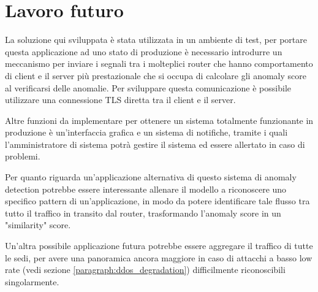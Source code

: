 \chapter{Lavoro futuro}

La soluzione qui sviluppata è stata utilizzata in un ambiente di test, per portare questa applicazione ad uno stato di produzione è necessario introdurre un meccanismo per inviare i segnali tra i molteplici router che hanno comportamento di client e il server più prestazionale che si occupa di calcolare gli anomaly score al verificarsi delle anomalie. Per sviluppare questa comunicazione è possibile utilizzare una connessione TLS diretta tra il client e il server.

Altre funzioni da implementare per ottenere un sistema totalmente funzionante in produzione è un'interfaccia grafica e un sistema di notifiche, tramite i quali l'amministratore di sistema potrà gestire il sistema ed essere allertato in caso di problemi. 



Per quanto riguarda un'applicazione alternativa di questo sistema di anomaly detection potrebbe essere interessante allenare il modello a riconoscere uno specifico pattern di un'applicazione, in modo da potere identificare tale flusso tra tutto il traffico in transito dal router, trasformando l'anomaly score in un "similarity" score.

Un'altra possibile applicazione futura potrebbe essere aggregare il traffico di tutte le sedi, per avere una panoramica ancora maggiore in caso di attacchi a basso low rate (vedi sezione \ref{paragraph:ddos_degradation}) difficilmente riconoscibili singolarmente.